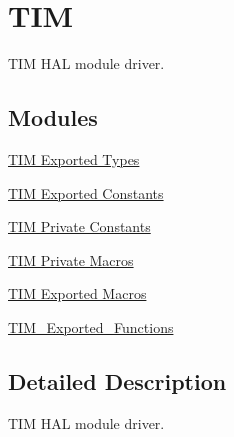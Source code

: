 \hypertarget{group___t_i_m}{\section{T\-I\-M}
\label{group___t_i_m}
}


T\-I\-M H\-A\-L module driver.  


\subsection*{Modules}
\begin{DoxyCompactItemize}
\item 
\hyperlink{group___t_i_m___exported___types}{T\-I\-M Exported Types}
\item 
\hyperlink{group___t_i_m___exported___constants}{T\-I\-M Exported Constants}
\item 
\hyperlink{group___t_i_m___private___constants}{T\-I\-M Private Constants}
\item 
\hyperlink{group___t_i_m___private___macros}{T\-I\-M Private Macros}
\item 
\hyperlink{group___t_i_m___exported___macros}{T\-I\-M Exported Macros}
\item 
\hyperlink{group___t_i_m___exported___functions}{T\-I\-M\-\_\-\-Exported\-\_\-\-Functions}
\end{DoxyCompactItemize}


\subsection{Detailed Description}
T\-I\-M H\-A\-L module driver. 